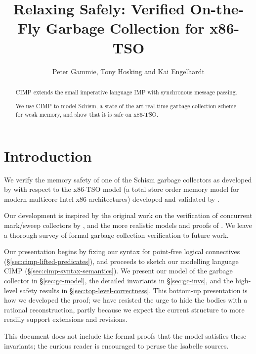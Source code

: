 \documentclass[11pt,a4paper]{article}
\begin{document}
\title{Relaxing Safely: Verified On-the-Fly Garbage Collection for x86-TSO}
\author{Peter Gammie, Tony Hosking and Kai Engelhardt}
\maketitle

\begin{abstract}
  CIMP extends the small imperative language IMP with synchronous
  message passing.

  We use CIMP to model Schism, a state-of-the-art real-time garbage
  collection scheme for weak memory, and show that it is safe on
  x86-TSO.
\end{abstract}

\tableofcontents

\section{Introduction}
\label{sec:introduction}

We verify the memory safety of one of the Schism garbage collectors as
developed by \citet{Pizlo+2010PLDI,Pizlo201xPhd} with respect to the
x86-TSO model (a total store order memory model for modern multicore
Intel x86 architectures) developed and validated by
\citet{DBLP:journals/cacm/SewellSONM10}.

Our development is inspired by the original work on the verification
of concurrent mark/sweep collectors by
\citet{DBLP:journals/cacm/DijkstraLMSS78}, and the more realistic
models and proofs of \citet{DBLP:conf/popl/DoligezG94}. We leave a
thorough survey of formal garbage collection verification to future
work.

Our presentation begins by fixing our syntax for point-free logical
connectives (\S\ref{sec:cimp-lifted-predicates}), and proceeds to
sketch our modelling language CIMP
(\S\ref{sec:cimp-syntax-semantics}). We present our model of the
garbage collector in \S\ref{sec:gc-model}, the detailed invariants in
\S\ref{sec:gc-invs}, and the high-level safety results in
\S\ref{sec:top-level-correctness}. This bottom-up presentation is how
we developed the proof; we have resisted the urge to hide the bodies
with a rational reconstruction, partly because we expect the current
structure to more readily support extensions and revisions.

This document does not include the formal proofs that the model
satisfies these invariants; the curious reader is encouraged to peruse
the Isabelle sources.





\end{document}
